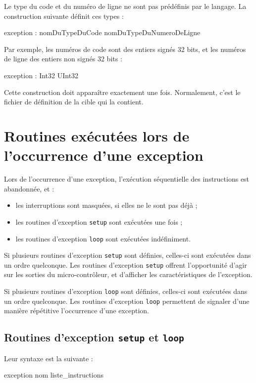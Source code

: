 Le type du code et du numéro de ligne ne sont pas prédéfinis par le langage. La construction suivante définit ces types :
\begin{PLM}
exception : nomDuTypeDuCode nomDuTypeDuNumeroDeLigne
\end{PLM}

Par exemple, les numéros de code sont des entiers signés 32 bits, et les numéros de ligne des entiers non signés 32 bits :
\begin{PLM}
exception : Int32 UInt32
\end{PLM}

Cette construction doit apparaître exactement une fois. Normalement, c'est le fichier de définition de la cible qui la contient.


\section{Routines exécutées lors de l'occurrence d'une exception}


Lors de l'occurrence d'une exception, l'exécution séquentielle des instructions est abandonnée, et :
\begin{itemize}
  \item les interruptions sont masquées, si elles ne le sont pas déjà ;
  \item les routines d'exception \texttt{setup} sont exécutées une fois ;
  \item les routines d'exception \texttt{loop} sont exécutées indéfiniment.
\end{itemize}

Si plusieurs routines d'exception \texttt{setup} sont définies, celles-ci sont exécutées dans un ordre quelconque. Les routines d'exception \texttt{setup} offrent l'opportunité d'agir sur les sorties du micro-contrôleur, et d'afficher les caractéristiques de l'exception.

Si plusieurs routines d'exception \texttt{loop} sont définies, celles-ci sont exécutées dans un ordre quelconque. Les routines d'exception \texttt{loop} permettent de signaler d'une manière répétitive l'occurrence d'une exception.

\subsection{Routines d'exception \texttt{setup} et \texttt{loop}}

Leur syntaxe est la suivante :
\begin{PLM}
exception nom {
  liste_instructions
}
\end{PLM}

